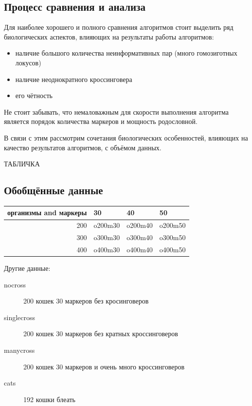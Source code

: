 \documentclass{matmex-diploma-custom}
\begin{document}
\subsection{Процесс сравнения и анализа}

Для наиболее хорошего и полного сравнения алгоритмов стоит выделить
ряд биологических аспектов, влияющих на результаты работы алгоритмов:
\begin{itemize}
\item наличие большого количества неинформативных пар (много
  гомозиготных локусов)
\item наличие неоднократного кроссинговера
\item его чётность
\end{itemize}

Не стоит забывать, что немаловажным для скорости выполнения алгоритма
является порядок количества маркеров и мощность родословной.

В связи с этим рассмотрим сочетания биологических особенностей,
влияющих на качество результатов алгоритмов, с объёмом данных.

ТАБЛИЧКА

\subsection{Обобщённые данные}
\begin{tabular}{rlll}
\hline
организмы and маркеры & 30 & 40 & 50 \\
\hline
200 & o200m30 & o200m40 & o200m50 \\
300 & o300m30 & o300m40 & o300m50 \\
400 & o400m30 & o400m40 & o400m50 \\
\hline
\end{tabular}

Другие данные:
\begin{description}
\item[nocross] 200 кошек 30 маркеров без кросинговеров
\item[singlecross] 200 кошек 30 маркеров без кратных кроссинговеров
\item[manycross] 200 кошек 30 маркеров и очень много кроссинговеров
\item[cats] 192 кошки блеать
\end{description}
\end{document}
